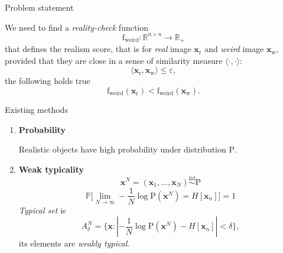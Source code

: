\documentclass{beamer}
\begin{document}
\begin{frame}{Problem statement}

We need to find a \textit{reality-check} function
\[\text{f}_\text{weird}: \mathbb{R}^{n\times n} \to \mathbb{R}_+\]
that defines the realism score, that is for \textit{real} image $\textbf{x}_\text{r}$ and \textit{weird} image $\textbf{x}_\text{w}$, provided that they are close in a sense of similarity measure $\langle \cdot, \cdot \rangle$:
\[ \langle \textbf{x}_\text{r}, \textbf{x}_\text{w}\rangle \le \varepsilon,\]
the following holds true
\[\text{f}_\text{weird}(\textbf{x}_\text{r}) < \text{f}_\text{weird}(\textbf{x}_\text{w}).\]


\end{frame}

\begin{frame}{Existing methods}

\begin{enumerate}
    \item \textbf{Probability}
    
    Realistic objects have high probability under distribution $\mathrm{P}$.

    \item \textbf{Weak typicality} \[\textbf{x}^N = (\textbf{x}_1, \dots, \textbf{x}_N) \overset{\mathrm{iid}}{\sim} \mathrm{P}\]
    \[\mathbb{P} \bigl[\lim\limits_{N \to \infty} -\dfrac1N \log \mathrm{P}(\textbf{x}^N) = H[\textbf{x}_n]\bigr] = 1\]
    \textit{Typical set} is \[A_\delta^N = \{\textbf{x}: | -\dfrac1N \log \mathrm{P}(\textbf{x}^N) - H[\textbf{x}_n]| < \delta \},\]
    its elements are \textit{weakly typical}.

\end{enumerate}

\end{frame}
\end{document}
